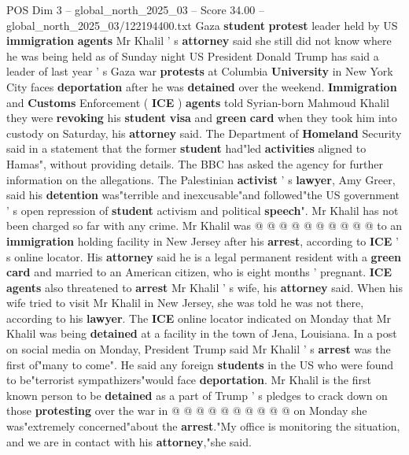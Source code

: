 \begin{textsample}{POS Dim 3 – global\_north\_2025\_03 – Score 34.00 – global\_north\_2025\_03/122194400.txt}  \label{ex:f3_pos_028}
Gaza \textbf{student} \textbf{protest} leader held by US \textbf{immigration} \textbf{agents} Mr Khalil ' s \textbf{attorney} said she still did not know where he was being held as of Sunday night US President Donald Trump has said a leader of last year ' s Gaza war \textbf{protests} at Columbia \textbf{University} in New York City faces \textbf{deportation} after he was \textbf{detained} over the weekend. \textbf{Immigration} and \textbf{Customs} Enforcement ( \textbf{ICE} ) \textbf{agents} told Syrian-born Mahmoud Khalil they were \textbf{revoking} his \textbf{student} \textbf{visa} and \textbf{green} \textbf{card} when they took him into custody on Saturday, his \textbf{attorney} said.
The Department of \textbf{Homeland} Security said in a statement that the former \textbf{student} had"led \textbf{activities} aligned to Hamas", without providing details.
The BBC has asked the agency for further information on the allegations.
The Palestinian \textbf{activist} ' s \textbf{lawyer}, Amy Greer, said his \textbf{detention} was"terrible and inexcusable"and followed"the US government ' s open repression of \textbf{student} activism and political \textbf{speech}".
Mr Khalil has not been charged so far with any crime.
Mr Khalil was @ @ @ @ @ @ @ @ @ @ to an \textbf{immigration} holding facility in New Jersey after his \textbf{arrest}, according to \textbf{ICE} ' s online locator.
His \textbf{attorney} said he is a legal permanent resident with a \textbf{green} \textbf{card} and married to an American citizen, who is eight months ' pregnant. \textbf{ICE} \textbf{agents} also threatened to \textbf{arrest} Mr Khalil ' s wife, his \textbf{attorney} said.
When his wife tried to visit Mr Khalil in New Jersey, she was told he was not there, according to his \textbf{lawyer}.
The \textbf{ICE} online locator indicated on Monday that Mr Khalil was being \textbf{detained} at a facility in the town of Jena, Louisiana.
In a post on social media on Monday, President Trump said Mr Khalil ' s \textbf{arrest} was the first of"many to come".
He said any foreign \textbf{students} in the US who were found to be"terrorist sympathizers"would face \textbf{deportation}.
Mr Khalil is the first known person to be \textbf{detained} as a part of Trump ' s pledges to crack down on those \textbf{protesting} over the war in @ @ @ @ @ @ @ @ @ @ on Monday she was"extremely concerned"about the \textbf{arrest}."My office is monitoring the situation, and we are in contact with his \textbf{attorney},"she said.

\end{textsample}
